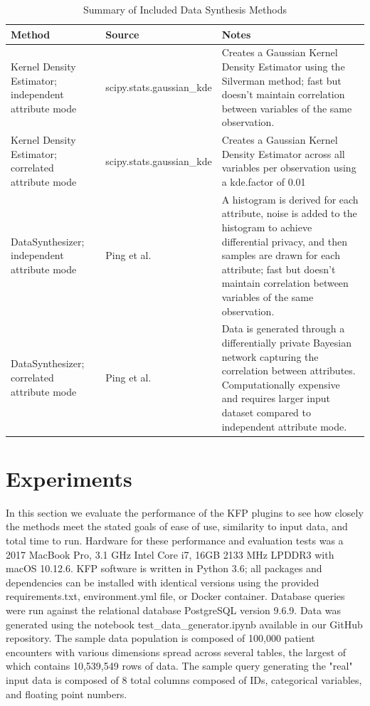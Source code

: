 \documentclass{amia}
\begin{document}
\begin{table}
   \caption{Summary of Included Data Synthesis Methods}
   \label{included-methods}
   \centering
   \begin{tabular}{p{12em} l p{20em}}
     \toprule
     Method                                 & Source                    & Notes \\
     \midrule
     Kernel Density Estimator; independent attribute mode
     & scipy.stats.gaussian\_kde
     & Creates a Gaussian Kernel Density Estimator using the Silverman method; fast but doesn’t maintain correlation between variables of the same observation.\\
     Kernel Density Estimator; correlated attribute mode &
     scipy.stats.gaussian\_kde &
     Creates a Gaussian Kernel Density Estimator across all variables per observation using a kde.factor of 0.01 \\
     DataSynthesizer; independent attribute mode
     & Ping et al.
     & A histogram is derived for each attribute, noise is added to the histogram to achieve differential privacy, and then samples are drawn for each attribute; fast but doesn’t maintain correlation between variables of the same observation.\\
     DataSynthesizer; correlated attribute mode
     & Ping et al.
     & Data is generated through a differentially private Bayesian network capturing the correlation between attributes. Computationally expensive and requires larger input dataset compared to independent attribute mode.\\
     \bottomrule
   \end{tabular}
 \end{table}

\section{Experiments}

In this section we evaluate the performance of the KFP plugins to see how closely the methods meet the stated goals of ease of use, similarity to input data, and total time to run. Hardware for these performance and evaluation tests was a 2017 MacBook Pro, 3.1 GHz Intel Core i7, 16GB 2133 MHz LPDDR3 with macOS 10.12.6. KFP software is written in Python 3.6; all packages and dependencies can be installed with identical versions using the provided requirements.txt, environment.yml file, or Docker container. Database queries were run against the relational database PostgreSQL version 9.6.9. Data was generated using the notebook test\_data\_generator.ipynb available in our GitHub repository. The sample data population is composed of 100,000 patient encounters with various dimensions spread across several tables, the largest of which contains 10,539,549 rows of data. The sample query generating the "real" input data is composed of 8 total columns composed of IDs, categorical variables, and floating point numbers.
\end{document}
